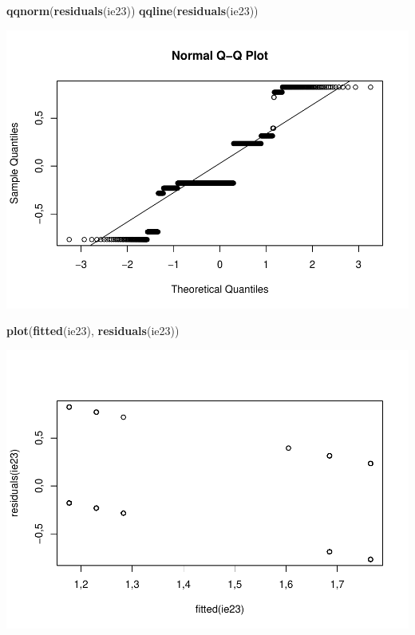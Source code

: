 \documentclass[]{article}
\newenvironment{Shaded}{\begin{snugshade}}{\end{snugshade}}
\newcommand{\KeywordTok}[1]{\textcolor[rgb]{0.13,0.29,0.53}{\textbf{#1}}}
\newcommand{\NormalTok}[1]{#1}
\begin{document}
\begin{Shaded}
\begin{Highlighting}[]
\KeywordTok{qqnorm}\NormalTok{(}\KeywordTok{residuals}\NormalTok{(ie23))}
\KeywordTok{qqline}\NormalTok{(}\KeywordTok{residuals}\NormalTok{(ie23))}
\end{Highlighting}
\end{Shaded}

\includegraphics{titanicDataClean_files/figure-latex/unnamed-chunk-25-15.pdf}

\begin{Shaded}
\begin{Highlighting}[]
\KeywordTok{plot}\NormalTok{(}\KeywordTok{fitted}\NormalTok{(ie23), }\KeywordTok{residuals}\NormalTok{(ie23))}
\end{Highlighting}
\end{Shaded}

\includegraphics{titanicDataClean_files/figure-latex/unnamed-chunk-25-16.pdf}
\end{document}
